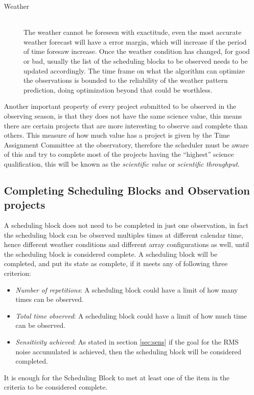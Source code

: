 \begin{description}
	\item[Weather] \hfill \\
The weather cannot be foreseen with exactitude, even the most accurate weather forecast will have a error margin, which will increase if the period of time foresaw increase. Once the weather condition has changed, for good or bad, usually the list of the scheduling blocks to be observed needs to be updated accordingly. The time frame on what the algorithm can optimize the observations is bounded to the reliability of the weather pattern prediction, doing optimization beyond that could be worthless.

\end{description}

Another important property of every project submitted to be observed in the observing season, is that they does not have the same science value, this means there are certain projects that are more interesting to observe and complete than others. This measure of how much value has a project is given by the Time Assignment Committee at the observatory, therefore the scheduler must be aware of this and try to complete most of the projects having the ``highest'' science qualification, this will be known as the \textit{scientific value} or \textit{scientific throughput}.

\subsection{Completing Scheduling Blocks and Observation projects}
\label{subsec:completing-obs}
A scheduling block does not need to be completed in just one observation, in fact the scheduling block can be observed multiples times at different calendar time, hence different weather conditions and different array configurations as well, until the scheduling block is considered complete.
A scheduling block will be completed, and put its state as complete, if it meets any of following three criterion:
\begin{itemize}
	\item \textit{Number of repetitions}: A scheduling block could have a limit of how many times can be observed.
	\item \textit{Total time observed}: A scheduling block could have a limit of how much time can be observed.
	\item \textit{Sensitivity achieved}: As stated in section \ref{sec:sens} if the goal for the RMS noise accumulated is achieved, then the scheduling block will be considered completed.
\end{itemize} 
It is enough for the Scheduling Block to met at least one of the item in the criteria to be considered complete.

